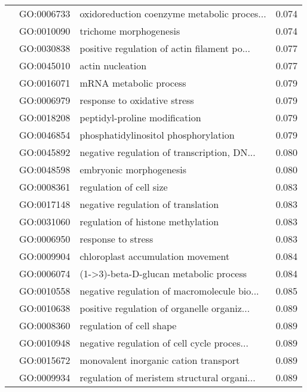 \begin{longtable}{lllr}
   & GO:0006733 &  oxidoreduction coenzyme metabolic proces... &         0.074 \\
   & GO:0010090 &                       trichome morphogenesis &         0.074 \\
   & GO:0030838 &  positive regulation of actin filament po... &         0.077 \\
   & GO:0045010 &                             actin nucleation &         0.077 \\
   & GO:0016071 &                       mRNA metabolic process &         0.079 \\
   & GO:0006979 &                 response to oxidative stress &         0.079 \\
   & GO:0018208 &                peptidyl-proline modification &         0.079 \\
   & GO:0046854 &         phosphatidylinositol phosphorylation &         0.079 \\
   & GO:0045892 &  negative regulation of transcription, DN... &         0.080 \\
   & GO:0048598 &                      embryonic morphogenesis &         0.080 \\
   & GO:0008361 &                      regulation of cell size &         0.083 \\
   & GO:0017148 &           negative regulation of translation &         0.083 \\
   & GO:0031060 &            regulation of histone methylation &         0.083 \\
   & GO:0006950 &                           response to stress &         0.083 \\
   & GO:0009904 &            chloroplast accumulation movement &         0.084 \\
   & GO:0006074 &       (1->3)-beta-D-glucan metabolic process &         0.084 \\
   & GO:0010558 &  negative regulation of macromolecule bio... &         0.085 \\
   & GO:0010638 &  positive regulation of organelle organiz... &         0.089 \\
   & GO:0008360 &                     regulation of cell shape &         0.089 \\
   & GO:0010948 &  negative regulation of cell cycle proces... &         0.089 \\
   & GO:0015672 &        monovalent inorganic cation transport &         0.089 \\
   & GO:0009934 &  regulation of meristem structural organi... &         0.089 \\

\end{longtable}
